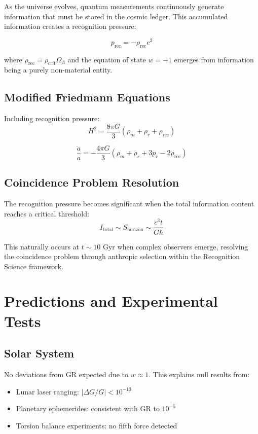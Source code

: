 \documentclass[12pt]{article}
\begin{document}
As the universe evolves, quantum measurements continuously generate information that must be stored in the cosmic ledger. This accumulated information creates a recognition pressure:

\begin{equation}
p_{\text{rec}} = -\rho_{\text{rec}} c^2
\end{equation}

where $\rho_{\text{rec}} = \rho_{\text{crit}} \Omega_\Lambda$ and the equation of state $w = -1$ emerges from information being a purely non-material entity.

\subsection{Modified Friedmann Equations}

Including recognition pressure:
\begin{equation}
H^2 = \frac{8\pi G}{3}\left(\rho_m + \rho_r + \rho_{\text{rec}}\right)
\end{equation}

\begin{equation}
\frac{\ddot{a}}{a} = -\frac{4\pi G}{3}\left(\rho_m + \rho_r + 3p_r - 2\rho_{\text{rec}}\right)
\end{equation}

\subsection{Coincidence Problem Resolution}

The recognition pressure becomes significant when the total information content reaches a critical threshold:
\begin{equation}
I_{\text{total}} \sim S_{\text{horizon}} \sim \frac{c^3 t}{G\hbar}
\end{equation}

This naturally occurs at $t \sim 10$ Gyr when complex observers emerge, resolving the coincidence problem through anthropic selection within the Recognition Science framework.

\section{Predictions and Experimental Tests}

\subsection{Solar System}
No deviations from GR expected due to $w \approx 1$. This explains null results from:
\begin{itemize}
\item Lunar laser ranging: $|\Delta G/G| < 10^{-13}$
\item Planetary ephemerides: consistent with GR to $10^{-5}$
\item Torsion balance experiments: no fifth force detected
\end{itemize}
\end{document}
